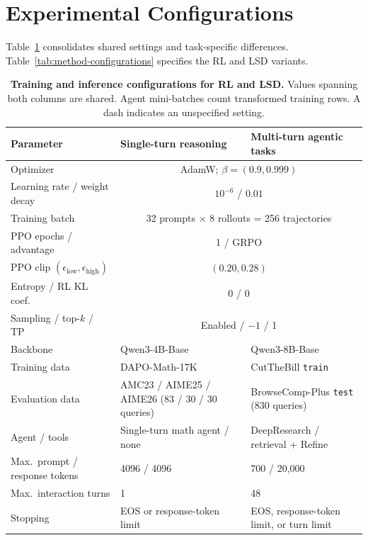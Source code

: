 \section{Experimental Configurations}
\label{app:experimental-configurations}

Table~\ref{tab:task-configurations} consolidates shared settings and task-specific
differences. Table~\ref{tab:method-configurations} specifies the RL and LSD variants.

\begin{table}[!htbp]
  \centering
  \caption{\textbf{Training and inference configurations for RL and LSD.} Values spanning both
  columns are shared. Agent mini-batches count transformed training rows.
  A dash indicates an unspecified setting.}
  \label{tab:task-configurations}
  \small
  \setlength{\tabcolsep}{4pt}
  \begin{tabularx}{\linewidth}{@{}lXX@{}}
    \toprule
    Parameter & Single-turn reasoning & Multi-turn agentic tasks \\
    \midrule
    Optimizer & \multicolumn{2}{c}{AdamW; $\beta=(0.9,0.999)$} \\
    Learning rate / weight decay & \multicolumn{2}{c}{$10^{-6}$ / $0.01$} \\
    Training batch & \multicolumn{2}{c}{32 prompts $\times$ 8 rollouts = 256 trajectories} \\
    PPO epochs / advantage & \multicolumn{2}{c}{1 / GRPO} \\
    PPO clip $(\epsilon_{\mathrm{low}},\epsilon_{\mathrm{high}})$ & \multicolumn{2}{c}{$(0.20,0.28)$} \\
    Entropy / RL KL coef. & \multicolumn{2}{c}{0 / 0} \\
    Sampling / top-$k$ / TP & \multicolumn{2}{c}{Enabled / $-1$ / 1} \\
    \midrule
    Backbone & Qwen3-4B-Base & Qwen3-8B-Base \\
    Training data & DAPO-Math-17K & CutTheBill \texttt{train} \\
    Evaluation data & AMC23 / AIME25 / AIME26 (83 / 30 / 30 queries) & BrowseComp-Plus \texttt{test} (830 queries) \\
    Agent / tools & Single-turn math agent / none & DeepResearch / retrieval + Refine \\
    Max.\ prompt / response tokens & 4096 / 4096 & 700 / 20,000 \\
    Max.\ interaction turns & 1 & 48 \\
    Stopping & EOS or response-token limit & EOS, response-token limit, or turn limit \\

\end{tabularx}
\end{table}
